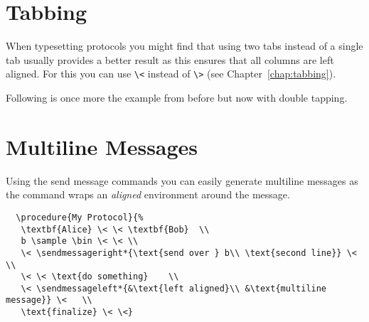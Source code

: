 \documentclass[a4paper]{report}
\begin{document}
  
  \section{Tabbing}
  When typesetting protocols you might find that using two tabs instead of a single tab usually provides
  a better result as this ensures that all columns are left aligned. 
  For this you can use \lstinline$\<$ instead of \lstinline$\>$ (see Chapter~\ref{chap:tabbing}).
  
  Following is once more the example from before but now with double tapping. 
  \begin{center}
  \end{center}
  
  \section{Multiline Messages}
  Using the send message commands you can easily generate multiline messages as the command
  wraps an \emph{aligned} environment around the message.
  \begin{center}
  \end{center}
  \begin{lstlisting}
  \procedure{My Protocol}{%
   \textbf{Alice} \< \< \textbf{Bob}  \\
   b \sample \bin \< \< \\
   \< \sendmessageright*{\text{send over } b\\ \text{second line}} \<  \\
   \< \< \text{do something}    \\
   \< \sendmessageleft*{&\text{left aligned}\\ &\text{multiline message}} \<   \\
   \text{finalize} \< \<}
  \end{lstlisting}
  
\end{document}
